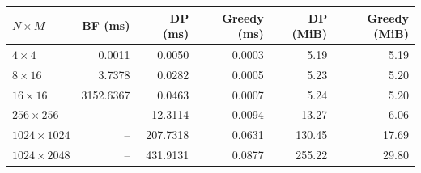 \begin{tabular}{lrrrrr}
\hline
$N\times M$ & BF (ms) & DP (ms) & Greedy (ms) & DP (MiB) & Greedy (MiB) \\
\hline
$4\times4$ & 0.0011 & 0.0050 & 0.0003 & 5.19 & 5.19 \\
$8\times16$ & 3.7378 & 0.0282 & 0.0005 & 5.23 & 5.20 \\
$16\times16$ & 3152.6367 & 0.0463 & 0.0007 & 5.24 & 5.20 \\
$256\times256$ & -- & 12.3114 & 0.0094 & 13.27 & 6.06 \\
$1024\times1024$ & -- & 207.7318 & 0.0631 & 130.45 & 17.69 \\
$1024\times2048$ & -- & 431.9131 & 0.0877 & 255.22 & 29.80 \\
\hline
\end{tabular}
